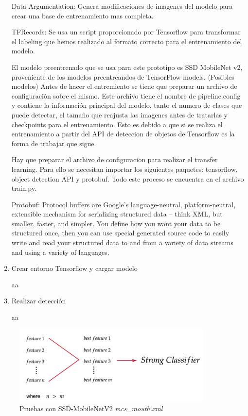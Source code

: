 \begin{enumerate}
	Data Argumentation: Genera modificaciones de imagenes del modelo para crear una base de entrenamiento mas completa.
	
	TFRecords: Se usa un script proporcionado por Tensorflow para transformar el labeling que hemos realizado al formato correcto para el entrenamiento del modelo.
	
	El modelo preentrenado que se usa para este prototipo es SSD MobileNet v2, proveniente de los modelos preentreandos de TensorFlow models. (Posibles modelos) Antes de hacer el entremiento se tiene que preparar un archivo de configuración sobre el mismo. Este archivo tiene el nombre de pipeline.config y contiene la información principal del modelo, tanto el numero de clases que puede detectar, el tamaño que reajusta las imagenes antes de tratarlas y checkpoints para el entrenamiento. Esto es debido a   que si se realiza el entrenamiento a partir del API de deteccion de objetos de Tensorflow es la forma de trabajar que sigue.
	
	Hay que preparar el archivo de configuracion para realizar el transfer learning. Para ello se necesitan importar los siguientes paquetes: tensorflow, object detection API y protobuf. Todo este proceso se encuentra en el archivo train.py.
	
	Protobuf: Protocol buffers are Google's language-neutral, platform-neutral, extensible mechanism for serializing structured data – think XML, but smaller, faster, and simpler. You define how you want your data to be structured once, then you can use special generated source code to easily write and read your structured data to and from a variety of data streams and using a variety of languages.
	
	\item Crear entorno Tensorflow y cargar modelo
	
	aa
	\newpage
	\item Realizar detección
	
	aa
\end{enumerate}

\begin{figure}[htp]
	\centering
	\includegraphics[width=10cm]{imagenes/ada1.png}
	\caption{Pruebas con SSD-MobileNetV2 \textit{mcs\_mouth.xml}}
	\label{fig:protoTensorFlow}
\end{figure}

